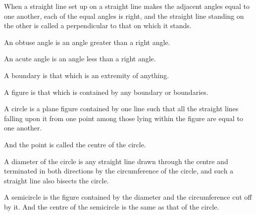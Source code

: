\begin{scope}
\label{def:I.10}
When a straight line set up on a straight line makes the adjacent
angles equal to one another, each of the equal angles is right, and
the straight line standing on the other is called a perpendicular to
that on which it stands.
\end{scope}

\begin{scope}
\label{def:I.11}
An obtuse angle is an angle greater than a right angle.
\end{scope}

\begin{scope}
\label{def:I.12}
An acute angle is an angle less than a right angle.
\end{scope}

\begin{scope}
\label{def:I.13}
A boundary is that which is an extremity of anything.
\end{scope}

\begin{scope}
\label{def:I.14}
A figure is that which is contained by any boundary or boundaries.
\end{scope}

\begin{scope}
\label{def:I.15}
A circle is a plane figure contained by one line such that all the
straight lines falling upon it from one point among those lying within
the figure are equal to one another.
\end{scope}

\begin{scope}
\label{def:I.16}
And the point is called the centre of the circle.
\end{scope}

\begin{scope}
\label{def:I.17}
A diameter of the circle is any straight line drawn through the centre
and terminated in both directions by the circumference of the circle,
and such a straight line also bisects the circle.
\end{scope}

\begin{scope}
\label{def:I.18}
A semicircle is the figure contained by the diameter and the
circumference cut off by it. And the centre of the semicircle is the
same as that of the circle.
\end{scope}

